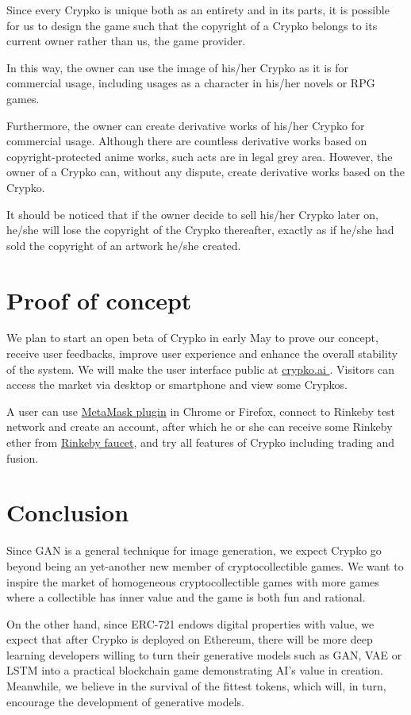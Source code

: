 \documentclass[a4paper]{article}
\begin{document}
Since every Crypko is unique both as an entirety and in its parts, it is possible for us to design the game such that the copyright of a Crypko belongs to its current owner rather than us, the game provider.

In this way, the owner can use the image of his/her Crypko as it is for commercial usage, including usages as a character in his/her novels or RPG games. 

Furthermore, the owner can create derivative works of his/her Crypko for commercial usage.
Although there are countless derivative works based on copyright-protected anime works, such acts are in legal grey area. However, the owner of a Crypko can, without any dispute, create derivative works based on the Crypko.

It should be noticed that if the owner decide to sell his/her Crypko later on, he/she will lose the copyright of the Crypko thereafter, exactly as if he/she had sold the copyright of an artwork he/she created.

\section{Proof of concept}

We plan to start an open beta of Crypko in early May to prove our concept, receive user feedbacks, improve user experience and enhance the overall stability of the system. We will make the user interface public at \href{http://crypko.ai}{ crypko.ai }. Visitors can access the market via desktop or smartphone and view some Crypkos.

A user can use \href{https://metamask.io/}{MetaMask plugin} in Chrome or Firefox, connect to Rinkeby test network and create an account, after which he or she can receive some Rinkeby ether from \href{https://www.rinkeby.io/#faucet}{Rinkeby faucet}, and try all features of Crypko including trading and fusion.

\section{Conclusion}

Since GAN is a general technique for image generation, we expect Crypko go beyond being an yet-another new member of cryptocollectible games. 
We want to inspire the market of homogeneous cryptocollectible games with more games where a collectible has inner value and the game is both fun and rational.

On the other hand, since ERC-721 endows digital properties with value, 
we expect that after Crypko is deployed on Ethereum, 
there will be more deep learning developers willing to turn their generative models such as GAN, VAE or LSTM 
into a practical blockchain game demonstrating AI's value in creation. Meanwhile, we believe in the survival of the fittest tokens, which will, in turn, encourage the development of generative models.
\end{document}
